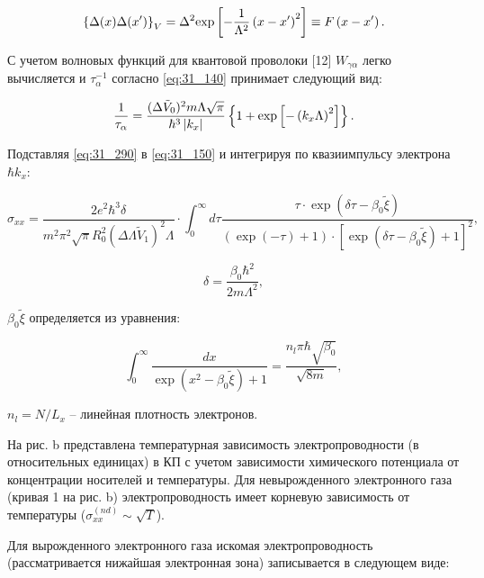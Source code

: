 \begin{equation} \label{eq:31_280}
\left\{\Delta (x)\Delta (x')\right\}_{V} =\Delta ^{2} {\rm exp}\left[-\frac{1}{\Lambda ^{2} } \left(x-x'\right)^{2} \right]\equiv F\left(x-x'\right).
\end{equation}

С учетом волновых функций для квантовой проволоки \cite{Constantinou1989}[12] $W_{\gamma \alpha } $ легко вычисляется и $\tau _{\alpha }^{-1} $ согласно \eqref{eq:31_140} принимает следующий вид:

\begin{equation} \label{eq:31_290}
\frac{1}{\tau _{\alpha } } =\frac{(\Delta \tilde{V}_{0} )^{2} m\Lambda \sqrt{\pi } }{\hbar ^{3} \left|k_{x} \right|} \left\{{\rm 1}+{\rm exp}\left[{\rm -}\left(k_{x} \Lambda \right)^{2} \right]\right\}.
\end{equation}

Подставляя \eqref{eq:31_290} в \eqref{eq:31_150} и интегрируя по квазиимпульсу электрона $\hbar k_{x} $:

\begin{equation} \label{eq:31_300}
\sigma _{xx} =\frac{2e^{2} \hbar ^{3} \delta }{m^{2} \pi ^{2} \sqrt{\pi } R_{0}^{2} \left(\Delta \Lambda \tilde{V}_{1} \right)^{2} \Lambda } \cdot \int _{0}^{\infty }d\tau \frac{\tau \cdot {\exp}\left(\delta \tau -\beta _{0} \tilde{\xi }\right)}{\left(\exp(-\tau )+1\right)\cdot \left[{\exp}\left(\delta \tau -\beta _{0} \tilde{\xi }\right)+1\right]^{2} },
\end{equation}

$$\delta =\frac{\beta _{0} \hbar ^{2} }{2m\Lambda ^{2} },$$

\noindent $\beta _{0} \tilde{\xi }$ определяется из уравнения:

\[
\int _{0}^{\infty }\frac{dx}{\exp \left(x^{2} -\beta _{0} \tilde{\xi }\right)+1} =\frac{n_{l} \pi \hbar \sqrt{\beta _{0} } }{\sqrt{8m} },
\]

\noindent $n_{l} =N/L_{x} $ -- линейная плотность электронов.

На рис. b представлена температурная зависимость электропроводности (в относительных единицах) в КП с учетом зависимости химического потенциала от концентрации носителей и температуры. Для невырожденного электронного газа (кривая 1 на рис. b) электропроводность имеет корневую зависимость от температуры ($\sigma _{xx}^{(nd)} \sim \sqrt{T} $).

Для вырожденного электронного газа искомая электропроводность (рассматривается нижайшая электронная зона) записывается в следующем виде:

